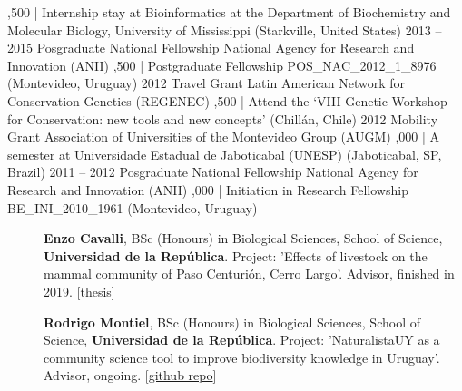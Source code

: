 \documentclass[9pt]{developercv} %
\begin{document}
\begin{entrylist}
		{,500 | Internship stay at Bioinformatics at the Department of Biochemistry and Molecular Biology, University of Mississippi (Starkville, United States)}
	\entry
		{2013 -- 2015}
		{Posgraduate National Fellowship}
		{National Agency for Research and Innovation (ANII)}
		{,500 | Postgraduate Fellowship POS\_NAC\_2012\_1\_8976 (Montevideo, Uruguay)}
	\entry
		{2012}
		{Travel Grant}
		{Latin American Network for Conservation Genetics (REGENEC)}
		{,500 | Attend the ‘VIII Genetic Workshop for Conservation: new tools and new concepts’ (Chillán, Chile)}
	\entry
		{2012}
		{Mobility Grant}
		{Association of Universities of the Montevideo Group (AUGM)}
		{,000 | A semester at Universidade Estadual de Jaboticabal (UNESP) (Jaboticabal, SP, Brazil)}
	\entry
		{2011 -- 2012}
		{Posgraduate National Fellowship}
		{National Agency for Research and Innovation (ANII)}
		{,000 | Initiation in Research Fellowship BE\_INI\_2010\_1961 (Montevideo, Uruguay)}

\end{entrylist}



\begin{description}
\item[]{\bf Enzo Cavalli}, BSc (Honours) in Biological Sciences, School of Science, {\bf Universidad de la Rep\'{u}blica}. Project: 'Effects of livestock on the mammal community of Paso Centurión, Cerro Largo'. Advisor, finished in 2019.  [\href{https://www.colibri.udelar.edu.uy/jspui/bitstream/20.500.12008/23484/6/uy24-19703.pdf}{thesis}]
\item[]{\bf Rodrigo Montiel}, BSc (Honours) in Biological Sciences, School of Science, {\bf Universidad de la Rep\'{u}blica}. Project: 'NaturalistaUY as a community science tool to improve biodiversity knowledge in Uruguay'. Advisor, ongoing.  [\href{https://github.com/Rodrigo-Montiel/TesisNaturalistaUY}{github repo}]
\end{description}


\end{document}
